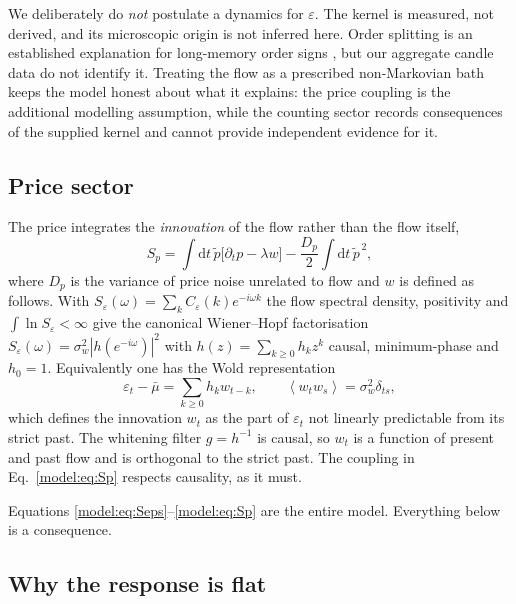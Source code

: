 \documentclass[aps,pre,twocolumn,superscriptaddress,floatfix,nofootinbib]{revtex4-2}
\newcommand{\eps}{\varepsilon}
\newcommand{\avg}[1]{\left\langle #1 \right\rangle}
\newcommand{\dd}{\mathrm{d}}
\begin{document}
We deliberately do \emph{not} postulate a dynamics for $\eps$. The kernel is
measured, not derived, and its microscopic origin is not inferred here. Order
splitting is an established explanation for long-memory order signs
\cite{lillo2005,sato2023prl,sato2023prr}, but our aggregate candle data do not
identify it. Treating the flow as a prescribed non-Markovian bath keeps the
model honest about what it explains: the price coupling is the additional
modelling assumption, while the counting sector records consequences of the
supplied kernel and cannot provide independent evidence for it.

\subsection{Price sector}

The price integrates the \emph{innovation} of the flow rather than the flow
itself,
\begin{equation}
  S_p = \int\!\dd t\, \tilde p\bigl[\partial_t p-\lambda w\bigr]
      - \frac{D_p}{2}\int\!\dd t\, \tilde p^{\,2} ,
  \label{model:eq:Sp}
\end{equation}
where $D_p$ is the variance of price noise unrelated to flow and $w$ is defined
as follows. With $S_\eps(\omega)=\sum_k C_\eps(k)e^{-i\omega k}$ the flow
spectral density, positivity and $\int\ln S_\eps<\infty$ give the canonical
Wiener--Hopf factorisation $S_\eps(\omega)=\sigma_w^2|h(e^{-i\omega})|^2$ with
$h(z)=\sum_{k\ge0}h_kz^k$ causal, minimum-phase and $h_0=1$. Equivalently one
has the Wold representation \cite{wold1938,hamilton1994}
\begin{equation}
  \eps_t-\bar\mu=\sum_{k\ge0}h_k w_{t-k} ,
  \qquad \avg{w_tw_s}=\sigma_w^2\delta_{ts} ,
  \label{model:eq:wold}
\end{equation}
which defines the innovation $w_t$ as the part of $\eps_t$ not linearly
predictable from its strict past. The whitening filter $g=h^{-1}$ is causal, so
$w_t$ is a function of present and past flow and is orthogonal to the strict
past. The coupling in
Eq.~\eqref{model:eq:Sp} respects causality, as it must.

Equations \eqref{model:eq:Seps}--\eqref{model:eq:Sp} are the entire model. Everything below
is a consequence.

\subsection{Why the response is flat}
\label{model:sec:flat}
\end{document}
